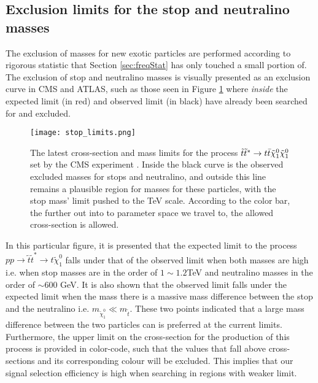 \subsection{Exclusion limits for the stop and neutralino masses}
The exclusion of masses for new exotic particles are performed according to rigorous statistic that Section \ref{sec:freqStat} has only touched a small portion of. The exclusion of stop and neutralino masses is visually presented as an exclusion curve in CMS and ATLAS, such as those seen in Figure \ref{fig:limits} \cite{cms2019search} where \textit{inside} the expected limit (in red) and observed limit (in black) have already been searched for and excluded. \\

\begin{figure}[htbp]
    \centering
    \texttt{[image: stop\_limits.png]}
    \caption{The latest cross-section and mass limits for the process $\Tilde{t}\Tilde{t}^* \rightarrow t\bar{t}\Tilde{\chi}_1^0\Tilde{\chi}_1^0 $ set by the CMS experiment \cite{cms2019search}. Inside the black curve is the observed excluded masses for stops and neutralino, and outside this line remains a plausible region for masses for these particles, with the stop mass' limit pushed to the TeV scale. According to the color bar, the further out into to parameter space we travel to, the allowed cross-section is allowed.}
    \label{fig:limits}
\end{figure}

In this particular figure, it is presented that the expected limit to the process $pp \rightarrow \tilde{t}\tilde{t}^* \rightarrow t\tilde{\chi}_1^0$ falls under that of the observed limit when both masses are high i.e.  when stop masses are in the order of $1\sim1.2$TeV and neutralino masses in the order of $\sim600$ GeV. It is also shown that the observed limit falls under the expected limit when the mass there is a massive mass difference between the stop and the neutralino i.e. $m_{\tilde{\chi}_1^0}\ll m_{\tilde{t}}$. These two points indicated that a large mass difference between the two particles can is preferred at the current limits. Furthermore, the upper limit on the cross-section for the production of this process is provided in color-code, such that the values that fall above cross-sections and its corresponding colour will be excluded. This implies that our signal selection efficiency is high when searching in regions with weaker limit. \\

